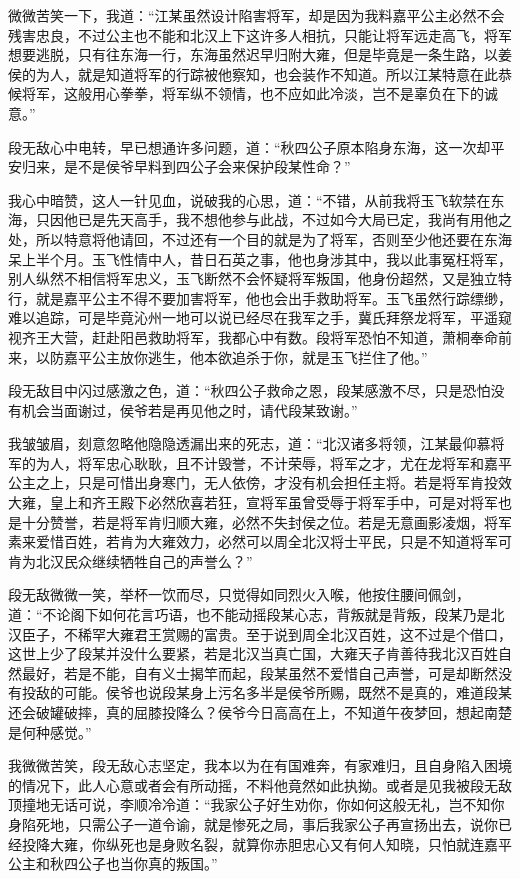 微微苦笑一下，我道：“江某虽然设计陷害将军，却是因为我料嘉平公主必然不会残害忠良，不过公主也不能和北汉上下这许多人相抗，只能让将军远走高飞，将军想要逃脱，只有往东海一行，东海虽然迟早归附大雍，但是毕竟是一条生路，以姜侯的为人，就是知道将军的行踪被他察知，也会装作不知道。所以江某特意在此恭候将军，这般用心拳拳，将军纵不领情，也不应如此冷淡，岂不是辜负在下的诚意。”

段无敌心中电转，早已想通许多问题，道：“秋四公子原本陷身东海，这一次却平安归来，是不是侯爷早料到四公子会来保护段某性命？”

我心中暗赞，这人一针见血，说破我的心思，道：“不错，从前我将玉飞软禁在东海，只因他已是先天高手，我不想他参与此战，不过如今大局已定，我尚有用他之处，所以特意将他请回，不过还有一个目的就是为了将军，否则至少他还要在东海呆上半个月。玉飞性情中人，昔日石英之事，他也身涉其中，我以此事冤枉将军，别人纵然不相信将军忠义，玉飞断然不会怀疑将军叛国，他身份超然，又是独立特行，就是嘉平公主不得不要加害将军，他也会出手救助将军。玉飞虽然行踪缥缈，难以追踪，可是毕竟沁州一地可以说已经尽在我军之手，冀氏拜祭龙将军，平遥窥视齐王大营，赶赴阳邑救助将军，我都心中有数。段将军恐怕不知道，萧桐奉命前来，以防嘉平公主放你逃生，他本欲追杀于你，就是玉飞拦住了他。”

段无敌目中闪过感激之色，道：“秋四公子救命之恩，段某感激不尽，只是恐怕没有机会当面谢过，侯爷若是再见他之时，请代段某致谢。”

我皱皱眉，刻意忽略他隐隐透漏出来的死志，道：“北汉诸多将领，江某最仰慕将军的为人，将军忠心耿耿，且不计毁誉，不计荣辱，将军之才，尤在龙将军和嘉平公主之上，只是可惜出身寒门，无人依傍，才没有机会担任主将。若是将军肯投效大雍，皇上和齐王殿下必然欣喜若狂，宣将军虽曾受辱于将军手中，可是对将军也是十分赞誉，若是将军肯归顺大雍，必然不失封侯之位。若是无意画影凌烟，将军素来爱惜百姓，若肯为大雍效力，必然可以周全北汉将士平民，只是不知道将军可肯为北汉民众继续牺牲自己的声誉么？”

段无敌微微一笑，举杯一饮而尽，只觉得如同烈火入喉，他按住腰间佩剑，道：“不论阁下如何花言巧语，也不能动摇段某心志，背叛就是背叛，段某乃是北汉臣子，不稀罕大雍君王赏赐的富贵。至于说到周全北汉百姓，这不过是个借口，这世上少了段某并没什么要紧，若是北汉当真亡国，大雍天子肯善待我北汉百姓自然最好，若是不能，自有义士揭竿而起，段某虽然不爱惜自己声誉，可是却断然没有投敌的可能。侯爷也说段某身上污名多半是侯爷所赐，既然不是真的，难道段某还会破罐破摔，真的屈膝投降么？侯爷今日高高在上，不知道午夜梦回，想起南楚是何种感觉。”

我微微苦笑，段无敌心志坚定，我本以为在有国难奔，有家难归，且自身陷入困境的情况下，此人心意或者会有所动摇，不料他竟然如此执拗。或者是见我被段无敌顶撞地无话可说，李顺冷冷道：“我家公子好生劝你，你如何这般无礼，岂不知你身陷死地，只需公子一道令谕，就是惨死之局，事后我家公子再宣扬出去，说你已经投降大雍，你纵死也是身败名裂，就算你赤胆忠心又有何人知晓，只怕就连嘉平公主和秋四公子也当你真的叛国。”

